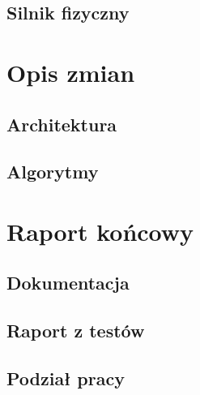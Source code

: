 \documentclass[a4paper,titlepage,10pt]{report}
\begin{document}
	\section{Silnik fizyczny}\label{sec:silnik fizyczny}
	

	\chapter{Opis zmian}\label{chap:opis zmian}
	\section{Architektura}\label{sec:architektura-zmiany}
	
	\section{Algorytmy}\label{sec:algorytmy}
	

	\chapter{Raport końcowy}\label{chap:raport końcowy}
	\section{Dokumentacja}\label{sec:dokumentacja}
	
	\section{Raport z testów}\label{sec:raport z testów}
	
	\section{Podział pracy}\label{sec:podzial}
	

	\newpage
	
	\newpage
\end{document}
